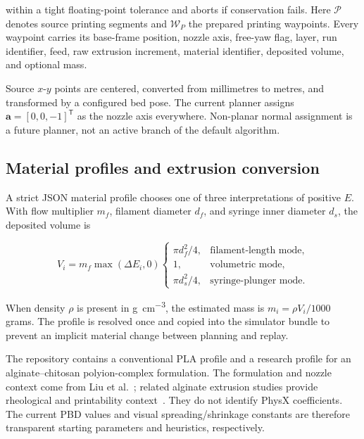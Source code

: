 \documentclass[letterpaper,10pt,conference]{ieeeconf}
\begin{document}
within a tight floating-point tolerance and aborts if conservation fails.
Here \(\mathcal{P}\) denotes source printing segments and
\(\mathcal{W}_{\!P}\) the prepared printing waypoints.  Every waypoint carries
its base-frame position, nozzle axis, free-yaw flag, layer, run identifier,
feed, raw extrusion increment, material identifier, deposited volume, and
optional mass.

Source \(x\)-\(y\) points are centered, converted from millimetres to metres,
and transformed by a configured bed pose.  The current planner assigns
\(\bm{a}=[0,0,-1]^\mathsf{T}\) as the nozzle axis everywhere.  Non-planar normal
assignment is a future planner, not an active branch of the default algorithm.

\subsection{Material profiles and extrusion conversion}

A strict JSON material profile chooses one of three interpretations of positive
\(E\).  With flow multiplier \(m_f\), filament diameter \(d_f\), and syringe
inner diameter \(d_s\), the deposited volume is

\begin{equation}
  V_i = m_f\max(\Delta E_i,0)
  \begin{cases}
    \pi d_f^2/4, & \text{filament-length mode},\\
    1,            & \text{volumetric mode},\\
    \pi d_s^2/4, & \text{syringe-plunger mode}.
  \end{cases}
  \label{eq:material-volume}
\end{equation}

When density \(\rho\) is present in \si{\gram\per\centi\meter\cubed}, the
estimated mass is \(m_i=\rho V_i/1000\) grams.  The profile is resolved once and
copied into the simulator bundle to prevent an implicit material change between
planning and replay.

The repository contains a conventional PLA profile and a research profile for
an alginate--chitosan polyion-complex formulation.  The formulation and nozzle
context come from Liu et al.~\cite{liu2018alginate}; related alginate extrusion
studies provide rheological and printability context~\cite{gao2024crosslinker,
wang2024handheld,jia2014alginate}.  They do not identify PhysX coefficients.
The current PBD values and visual spreading/shrinkage constants are therefore
transparent starting parameters and heuristics, respectively.
\end{document}
